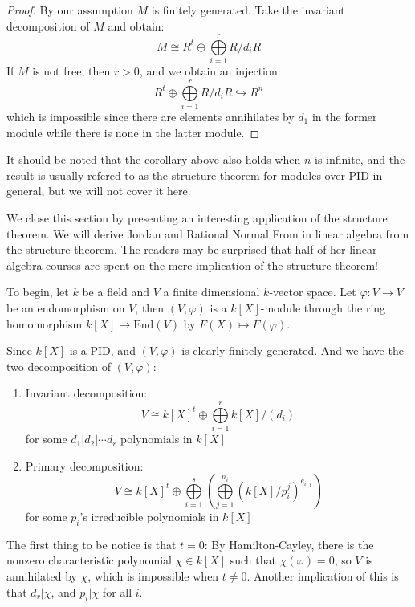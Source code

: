 \documentclass{note-eng}
\begin{document}
\begin{proof}
    By our assumption $M$ is finitely generated. Take the invariant decomposition of $M$ and obtain:
    $$M \cong R^t \oplus \bigoplus\limits_{i = 1}^{r} R / d_iR$$
    If $M$ is not free, then $r \gt 0$, and we obtain an injection:
    $$R^t \oplus \bigoplus\limits_{i = 1}^{r} R / d_iR \hookrightarrow R^n$$
    which is impossible since there are elements annihilates by $d_1$ in the former module while there is none in the latter module.
\end{proof}

It should be noted that the corollary above also holds when $n$ is infinite, and the result is usually refered to as the structure theorem for modules over PID in general, but we will not cover it here.

We close this section by presenting an interesting application of the structure theorem. We will derive Jordan and Rational Normal From in linear algebra from the structure theorem. The readers may be surprised that half of her linear algebra courses are spent on the mere implication of the structure theorem!

To begin, let $k$ be a field and $V$ a finite dimensional $k$-vector space. Let $\varphi: V \rightarrow V$ be an endomorphism on $V$, then $(V, \varphi)$ is a $k[X]$-module through the ring homomorphism $k[X] \rightarrow \mathrm{End}(V)$ by $F(X) \mapsto F(\varphi)$.

Since $k[X]$ is a PID, and $(V, \varphi)$ is clearly finitely generated. And we have the two decomposition of $(V, \varphi)$:

\begin{enumerate}
    \item Invariant decomposition:
    $$V \cong k[X]^t \oplus \bigoplus\limits_{i = 1}^{r} k[X] / (d_i)$$
    for some $d_1 | d_2 | \cdots d_r$ polynomials in $k[X]$
    \item Primary decomposition:
    $$V \cong k[X]^t \oplus \bigoplus\limits_{i = 1}^{s} \left(\bigoplus\limits_{j = 1}^{n_i} (k[X] / p_i^j)^{e_{i, j}}\right)$$
    for some $p_i$'s irreducible polynomials in $k[X]$
\end{enumerate}

The first thing to be notice is that $t = 0$: By Hamilton-Cayley, there is the nonzero characteristic polynomial $\chi \in k[X]$ such that $\chi(\varphi) = 0$, so $V$ is annihilated by $\chi$, which is impossible when $t \ne 0$. Another implication of this is that $d_r | \chi$, and $p_i | \chi$ for all $i$.
\end{document}
